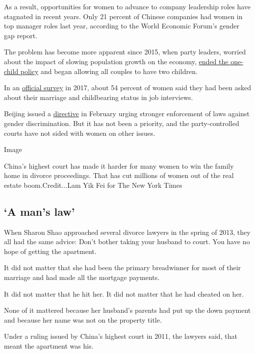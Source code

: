 As a result, opportunities for women to advance to company leadership
roles have stagnated in recent years. Only 21 percent of Chinese
companies had women in top manager roles last year, according to the
World Economic Forum's gender gap report.

The problem has become more apparent since 2015, when party leaders,
worried about the impact of slowing population growth on the economy,
\href{https://www.nytimes3xbfgragh.onion/2015/10/30/world/asia/china-end-one-child-policy.html}{ended
the one-child policy} and began allowing all couples to have two
children.

In an \href{http://www.wsic.ac.cn/academicnews/90644.htm}{official
survey} in 2017, about 54 percent of women said they had been asked
about their marriage and childbearing status in job interviews.

Beijing issued a
\href{https://www.nytimes3xbfgragh.onion/2019/02/21/world/china-gender-discrimination-workplace.html}{directive}
in February urging stronger enforcement of laws against gender
discrimination. But it has not been a priority, and the party-controlled
courts have not sided with women on other issues.

Image

China's highest court has made it harder for many women to win the
family home in divorce proceedings. That has cut millions of women out
of the real estate boom.Credit...Lam Yik Fei for The New York Times

\hypertarget{a-mans-law}{%
\subsection{`A man's law'}\label{a-mans-law}}

When Sharon Shao approached several divorce lawyers in the spring of
2013, they all had the same advice: Don't bother taking your husband to
court. You have no hope of getting the apartment.

It did not matter that she had been the primary breadwinner for most of
their marriage and had made all the mortgage payments.

It did not matter that he hit her. It did not matter that he had cheated
on her.

None of it mattered because her husband's parents had put up the down
payment and because her name was not on the property title.

Under a ruling issued by China's highest court in 2011, the lawyers
said, that meant the apartment was his.

